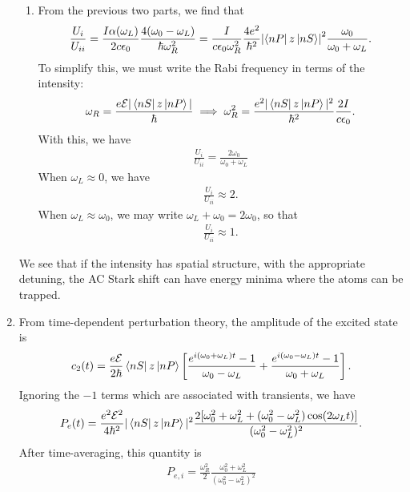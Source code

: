 \documentclass{article}
\theoremstyle{definition}
\newcommand{\al}{\alpha}
\newcommand{\f}[2]{\frac{#1}{#2}}
\newcommand{\lb}{\left[}
\newcommand{\rb}{\right]}
\begin{document}
\begin{enumerate}[label=(\alph*)]
\begin{enumerate}[label=(\roman*)]
		
		\item From the previous two parts, we find that
		\begin{align*}
		\f{U_i}{U_{ii}} = \f{I\al(\omega_L)}{2c\epsilon_0} \f{4(\omega_0 - \omega_L)}{\hbar \omega_R^2}  = \f{I}{c\epsilon_0 \omega_R^2 }\f{4e^2}{\hbar^2} \abs{\bra{nP} z \ket{nS}}^2 \f{\omega_0}{\omega_0 + \omega_L}.
		\end{align*}
		To simplify this, we must write the Rabi frequency in terms of the intensity:
		\begin{align*}
			\omega_R = \f{e\mathcal{E}|\bra{nS} z \ket{nP}|}{\hbar} \implies \omega_R^2 = \f{e^2|\bra{nS} z \ket{nP}|^2}{\hbar^2} \f{2I}{c\epsilon_0}.
		\end{align*}
		With this, we have
		\begin{align*}
			{\f{U_{i}}{U_{ii}} = \f{2\omega_0}{\omega_0 + \omega_L}}
		\end{align*}
		When $\omega_L \approx 0$, we have
		\begin{align*}
		\f{U_i}{U_{ii}} \approx 2.
		\end{align*}
		When $\omega_L \approx \omega_0$, we may write $\omega_L + \omega_0 = 2\omega_0$, so that
		\begin{align*}
		\f{U_i}{U_{ii}} \approx 1.
		\end{align*}
	\end{enumerate}
	We see that if the intensity has spatial structure, with the appropriate detuning, the AC Stark shift can have energy minima where the atoms can be trapped. 
	
	\item From time-dependent perturbation theory, the amplitude of the excited state is
	\begin{align*}
	c_2(t) =  \f{e\mathcal{E}}{2\hbar} \bra{nS} z \ket{nP} \lb \f{e^{i(\omega_0+\omega_L)t}-1}{\omega_0-\omega_L} + \f{e^{i(\omega_0-\omega_L)t}-1}{\omega_0+\omega_L} \rb.
	\end{align*}
	Ignoring the $-1$ terms which are associated with transients, we have
	\begin{align*}
		P_e(t) = \f{e^2\mathcal{E}^2}{4\hbar^2}|\bra{nS}z \ket{nP}|^2 \f{2[\omega_0^2+\omega_L^2+(\omega_0^2-\omega_L^2)\cos(2\omega_L t)]}{(\omega_0^2-\omega_L^2)^2}.
	\end{align*}
	After time-averaging, this quantity is 
	\begin{align*}
		P_{e,i} = {\f{\omega_R^2}{2} \f{\omega_0^2+\omega_L^2}{(\omega_0^2-\omega_L^2)^2}}
	\end{align*}



\end{enumerate}
\end{document}
